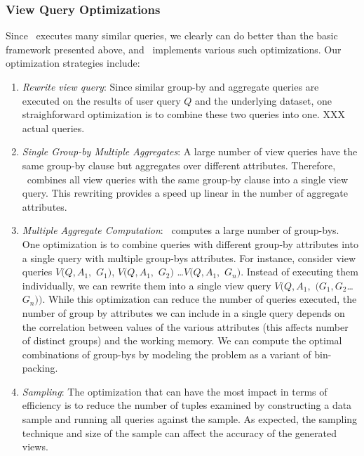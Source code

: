 \subsubsection{View Query Optimizations}
\label{subsubsec:optimizations}

Since \SeeDB\ executes many similar queries, we clearly can do better than
the basic framework presented above, and \SeeDB\ implements various such
optimizations. Our optimization strategies include:

\begin{enumerate}
  \item {\it Rewrite view query}: Since similar group-by and aggregate queries
  are executed on the results of user query $Q$ and the underlying dataset,
  one straighforward optimization is to combine these two queries into one. 
  XXX actual queries.
  \item {\it Single Group-by Multiple Aggregates}: A large number of view
  queries have the same group-by clause but aggregates over different attributes.
  Therefore, \SeeDB\ combines all view queries with the same group-by clause
  into a single view query. This rewriting provides a speed up linear in the
  number of aggregate attributes.
  \item {\it Multiple Aggregate Computation}: 
  \SeeDB\ computes a large number of group-bys. One optimization is to
  combine queries with different group-by attributes into a single query with
  multiple group-bys attributes. For instance, consider view queries $V(Q,
  A_1,$ $G_1)$, $V(Q, A_1,$ $G_2)$ \ldots $V(Q, A_1,$ $G_n)$. Instead of
  executing them individually, we can rewrite them into a single view query
  $V(Q, A_1,$ $(G_1, G_2$\ldots $G_n))$. While this optimization can reduce the
  number of queries executed, the number of group by attributes we can include in a single query
  depends on the correlation between values of the various attributes (this
  affects number of distinct groups) and the working memory. We can compute the
  optimal combinations of group-bys by modeling the problem as a variant of
  bin-packing. 
  \item {\it Sampling}: The optimization that can have the most impact in
  terms of efficiency is to reduce the number of tuples examined by
  constructing a data sample and running all queries against the sample. As
  expected, the sampling technique and size of the sample can affect the
  accuracy of the generated views. 
\end{enumerate}



